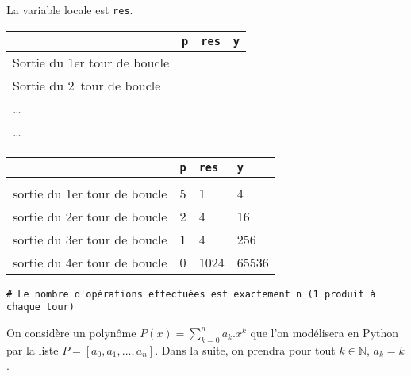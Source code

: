 \ifprof
\begin{corrige}
La variable locale est \texttt{res}.
\end{corrige}
\else
\fi	
\ifprof
\else	
	\begin{center}
		\begin{tabular}{lp{1cm}p{1cm}p{1cm}}
		\hline
			& \texttt{p} & \texttt{res} & \texttt{y}\\
			\hline
			Sortie du 1{\textrm{er}} tour de boucle && & \\[3mm]
			Sortie du 2\ieme\  tour de boucle && & \\[3mm]
			\ldots && & \\[3mm]
			\ldots&& & \\[3mm]
\hline
		\end{tabular}
	\end{center}
\fi

\ifprof
\begin{corrige}
\begin{center}
\begin{tabular}{|l|p{1cm}|p{1cm}|p{1cm}|}
\hline & \texttt{p} & \texttt{res} & \texttt{y}\\
\hline &&&\\
sortie du 1{\textrm{er}} tour de boucle & 5 & 1 & 4\\
sortie du 2{\textrm{er}} tour de boucle & 2 & 4 & 16\\
sortie du 3{\textrm{er}} tour de boucle & 1 & 4 & 256\\
sortie du 4{\textrm{er}} tour de boucle & 0 & 1024 & 65536\\
\end{tabular}
\end{center}
\begin{lstlisting}
# Le nombre d'opérations effectuées est exactement n (1 produit à chaque tour)
\end{lstlisting}
\end{corrige}
\else
\fi	
	


On considère un polynôme $P(x)=\sum_{k=0}^n a_k.x^k$ que l'on modélisera en Python par la liste $P=[a_0,a_1,...,a_n]$. Dans la suite, on prendra pour tout $k\in\mathbb{N}$, $a_k=k$.

